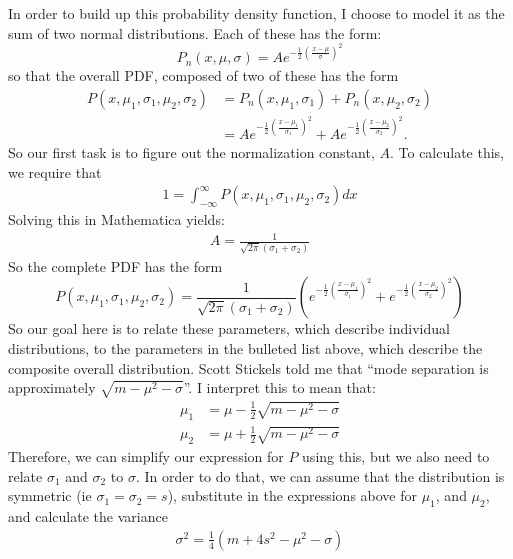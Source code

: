 \documentclass{article}
\begin{document}
In order to build up this probability density function, I choose to model it as the sum of two normal distributions.  Each of these has the form:
\begin{equation}
P_n(x,\mu,\sigma) = A e^{-\frac{1}{2}\left(\frac{x-\mu}{\sigma}\right)^2}
\end{equation}
so that the overall PDF, composed of two of these has the form
\begin{align}
P(x,\mu_1,\sigma_1,\mu_2,\sigma_2) & = P_n(x,\mu_1,\sigma_1) + P_n(x,\mu_2,\sigma_2)\\
& =  A e^{-\frac{1}{2}\left(\frac{x-\mu_1}{\sigma_1}\right)^2}+ A e^{-\frac{1}{2}\left(\frac{x-\mu_2}{\sigma_2}\right)^2}.
\end{align}
So our first task is to figure out the normalization constant, $A$.  To calculate this, we require that
\begin{align}
1 = \int_{-\infty}^{\infty} P(x,\mu_1,\sigma_1,\mu_2,\sigma_2)dx
\end{align}
Solving this in Mathematica yields:
\begin{align}
A=\frac{1}{\sqrt{2 \pi}\left(\sigma_1 + \sigma_2 \right)}
\end{align}
So the complete PDF has the form
\begin{equation}
P(x,\mu_1,\sigma_1,\mu_2,\sigma_2) = \frac{1}{\sqrt{2 \pi}\left(\sigma_1 + \sigma_2 \right)}\left( e^{-\frac{1}{2}\left(\frac{x-\mu_1}{\sigma_1}\right)^2}+  e^{-\frac{1}{2}\left(\frac{x-\mu_2}{\sigma_2}\right)^2}\right)
\end{equation}
So our goal here is to relate these parameters, which describe individual distributions, to the parameters in the bulleted list above, which describe the composite overall distribution.  Scott Stickels told me that ``mode separation is approximately $\sqrt{m-\mu^2-\sigma}$''.  I interpret this to mean that:
\begin{align}
\mu_1 & = \mu - \frac{1}{2}\sqrt{m-\mu^2-\sigma} \\
\mu_2 & = \mu + \frac{1}{2}\sqrt{m-\mu^2-\sigma} 
\end{align}
Therefore, we can simplify our expression for $P$ using this, but we also need to relate $\sigma_1$ and $\sigma_2$ to $\sigma$.  In order to do that, we can assume that the distribution is symmetric (ie $\sigma_1=\sigma_2=s$), substitute in the expressions above for $\mu_1$, and $\mu_2$, and calculate the variance 
\begin{align}
\sigma^2 = \frac{1}{4}\left(m+4s^2-\mu^2-\sigma \right)
\end{align}
\end{document}
